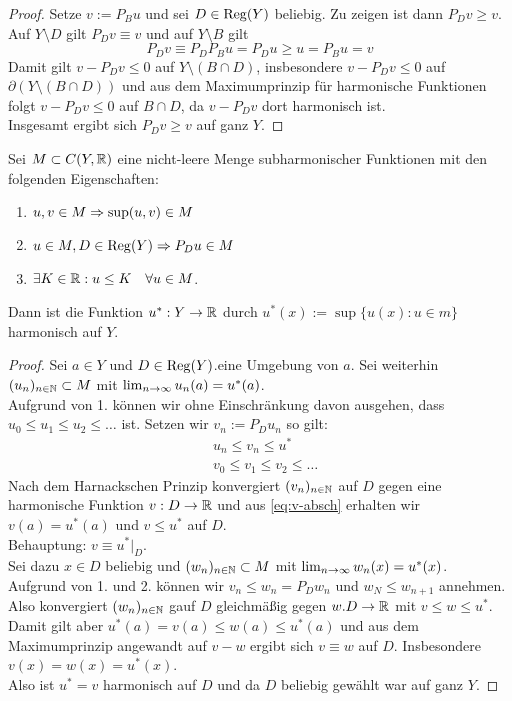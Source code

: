 \begin{proof}
  Setze $v:= P_B u$ und sei $D \in \operatorname{Reg}(Y)$ beliebig. Zu zeigen ist
  dann $P_D v \geq v$. \\
  Auf $Y \setminus D$ gilt $P_Dv \equiv v$ und auf $Y\setminus B$ gilt
  \[
  P_Dv \equiv P_DP_Bu = P_Du \geq u = P_Bu = v
  \]
  Damit gilt $v - P_Dv \leq 0$ auf $Y \setminus (B \cap D)$,
  insbesondere $v- P_D v \leq 0$ auf $\partial (Y \setminus (B \cap
  D))$ und aus dem Maximumprinzip für harmonische Funktionen folgt $v
  - P_D v \leq 0$ auf $B \cap D$, da $v - P_D v$ dort harmonisch
  ist.\\
  Insgesamt ergibt sich $P_Dv \geq v$ auf ganz $Y$.
\end{proof}

\begin{lemma}[Perron]
  \label{lemma:perron}
  Sei $M \subset C(Y, \mathbb{R})$ eine nicht-leere Menge subharmonischer
  Funktionen mit den folgenden Eigenschaften:
  \begin{enumerate}
  \item $u,v \in M \Rightarrow \sup(u,v) \in M$
  \item $u \in M, D \in \operatorname{Reg}(Y) \Rightarrow P_Du \in M$
  \item $\exists K \in \mathbb{R}: u \leq K \quad \forall u \in M$.
  \end{enumerate}
  Dann ist die Funktion $u^\ast : Y \rightarrow \mathbb{R}$ durch $u^\ast(x) :=
  \sup\{u(x) : u \in m \}$ harmonisch auf $Y$.
\end{lemma}

\begin{proof}
  Sei $a \in Y$ und $D \in \operatorname{Reg}(Y)$.eine Umgebung von $a$. Sei
  weiterhin $(u_n)_{n \in \mathbb{N}} \subset M$ mit $\lim_{n \rightarrow \infty}
  u_n(a) = u^\ast(a)$. \\
  Aufgrund von 1. können wir ohne Einschränkung davon ausgehen, dass
  $u_0 \leq u_1 \leq u_2 \leq \dots$ ist. Setzen wir $v_n := P_D u_n$ so gilt:
  \begin{align*}
   & u_n \leq v_n \leq u^\ast \label{eq:v-absch} \tag{1}\\
   & v_0 \leq v_1 \leq v_2 \leq \dots
  \end{align*}
  Nach dem Harnackschen Prinzip konvergiert $(v_n)_{n \in \mathbb{N}}$ auf $D$
  gegen eine harmonische Funktion $v: D \rightarrow \mathbb{R}$ und aus
  \eqref{eq:v-absch} erhalten wir $v(a) = u^\ast(a)$ und $v \leq
  u^\ast$ auf $D$. \\
  Behauptung: $v \equiv u^\ast|_D$. \\
  Sei dazu $x \in D$ beliebig und $(w_n)_{n\in \mathbb{N}}\subset M$ mit
  $\lim_{n \rightarrow \infty}w_n(x) = u^\ast(x)$. \\
  Aufgrund von 1. und 2. können wir $v_n \leq w_n = P_D w_n$ und $w_N
  \leq w_{n+1}$ annehmen. Also konvergiert $(w_n)_{n \in \mathbb{N}}$ gauf $D$
  gleichmäßig gegen $w. D \rightarrow \mathbb{R}$ mit $v \leq w \leq u^\ast$. \\
  Damit gilt aber $u^\ast(a) = v(a) \leq w(a) \leq u^\ast(a)$ und aus
  dem Maximumprinzip angewandt auf $v-w$ ergibt sich $v \equiv w$ auf
  $D$. Insbesondere $v(x) = w(x) = u^\ast(x)$. \\
  Also ist $u^\ast = v$ harmonisch auf $D$ und da $D$ beliebig gewählt
  war auf ganz $Y$.
\end{proof}

